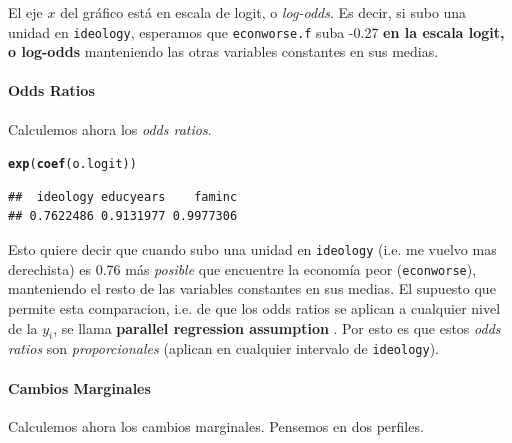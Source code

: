 \documentclass[onesided]{article}\usepackage[]{graphicx}\usepackage[]{color}
\makeatletter
\newcommand{\hlstd}[1]{\textcolor[rgb]{0.345,0.345,0.345}{#1}}%
\newcommand{\hlkwd}[1]{\textcolor[rgb]{0.737,0.353,0.396}{\textbf{#1}}}%
\newenvironment{kframe}{%
 \def\at@end@of@kframe{}%
 \ifinner\ifhmode%
  \def\at@end@of@kframe{\end{minipage}}%
  \begin{minipage}{\columnwidth}%
 \fi\fi%
 \def\FrameCommand##1{\hskip\@totalleftmargin \hskip-\fboxsep
 \colorbox{shadecolor}{##1}\hskip-\fboxsep
     \hskip-\linewidth \hskip-\@totalleftmargin \hskip\columnwidth}%
 \MakeFramed {\advance\hsize-\width
   \@totalleftmargin\z@ \linewidth\hsize
   \@setminipage}}%
 {\par\unskip\endMakeFramed%
 \at@end@of@kframe}
\newenvironment{knitrout}{}{} %
\makeatother
\begin{document}
El eje $x$ del gr\'afico est\'a en escala de logit, o \emph{log-odds}. Es decir, si subo una unidad en \texttt{ideology}, esperamos que \texttt{econworse.f} suba  -0.27 {\bf en la escala logit, o log-odds} manteniendo las otras variables constantes en sus medias. 

\paragraph{Odds Ratios} Calculemos ahora los \emph{odds ratios}.


\begin{knitrout}
\color{fgcolor}\begin{kframe}
\begin{alltt}
\hlkwd{exp}\hlstd{(}\hlkwd{coef}\hlstd{(o.logit))}
\end{alltt}
\begin{verbatim}
##  ideology educyears    faminc 
## 0.7622486 0.9131977 0.9977306
\end{verbatim}
\end{kframe}
\end{knitrout}

Esto quiere decir que cuando subo una unidad en \texttt{ideology} (i.e. me vuelvo mas derechista) es 0.76 m\'as \emph{posible} que encuentre la econom\'ia peor (\texttt{econworse}), manteniendo el resto de las variables constantes en sus medias. El supuesto que permite esta comparacion, i.e. de que los odds ratios se aplican a cualquier nivel de la $y_{i}$, se llama {\bf parallel regression assumption} \parencite[140]{Long:1997wv}. Por esto es que estos \emph{odds ratios} son \emph{proporcionales} (aplican en cualquier intervalo de \texttt{ideology}). 


\paragraph{Cambios Marginales} Calculemos ahora los cambios marginales. Pensemos en dos perfiles.
\end{document}
